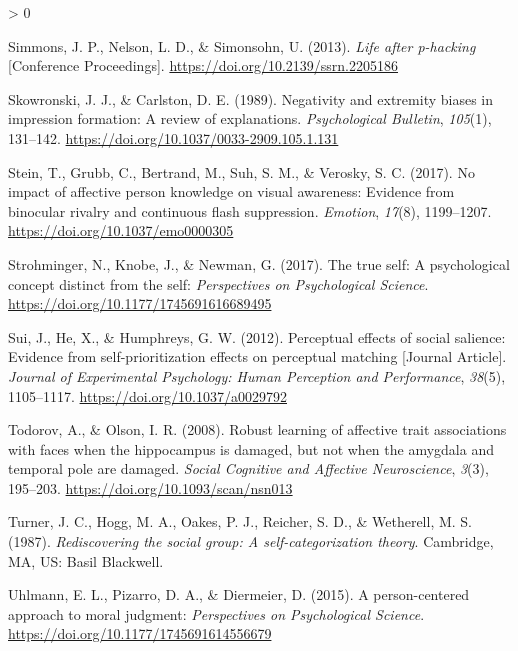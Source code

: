 \documentclass[
  english,
  man]{apa6}
\newlength{\cslhangindent}
\newenvironment{CSLReferences}[2] %
 {%
  \setlength{\parindent}{0pt}
  \ifodd #1 \everypar{\setlength{\hangindent}{\cslhangindent}}\ignorespaces\fi
  \ifnum #2 > 0
  \setlength{\parskip}{#2\baselineskip}
  \fi
 }%
 {}
\begin{document}
\begin{CSLReferences}{1}{0}
\leavevmode\hypertarget{ref-Simmons_2013_life}{}%
Simmons, J. P., Nelson, L. D., \& Simonsohn, U. (2013). \emph{Life after p-hacking} {[}Conference Proceedings{]}. \url{https://doi.org/10.2139/ssrn.2205186}

\leavevmode\hypertarget{ref-skowronski_negativity_1989}{}%
Skowronski, J. J., \& Carlston, D. E. (1989). Negativity and extremity biases in impression formation: A review of explanations. \emph{Psychological Bulletin}, \emph{105}(1), 131--142. \url{https://doi.org/10.1037/0033-2909.105.1.131}

\leavevmode\hypertarget{ref-stein_no_2017}{}%
Stein, T., Grubb, C., Bertrand, M., Suh, S. M., \& Verosky, S. C. (2017). No impact of affective person knowledge on visual awareness: Evidence from binocular rivalry and continuous flash suppression. \emph{Emotion}, \emph{17}(8), 1199--1207. \url{https://doi.org/10.1037/emo0000305}

\leavevmode\hypertarget{ref-strohminger_true_2017}{}%
Strohminger, N., Knobe, J., \& Newman, G. (2017). The true self: A psychological concept distinct from the self: \emph{Perspectives on Psychological Science}. \url{https://doi.org/10.1177/1745691616689495}

\leavevmode\hypertarget{ref-Sui_2012_JEPHPP}{}%
Sui, J., He, X., \& Humphreys, G. W. (2012). Perceptual effects of social salience: Evidence from self-prioritization effects on perceptual matching {[}Journal Article{]}. \emph{Journal of Experimental Psychology: Human Perception and Performance}, \emph{38}(5), 1105--1117. \url{https://doi.org/10.1037/a0029792}

\leavevmode\hypertarget{ref-todorov_robust_2008}{}%
Todorov, A., \& Olson, I. R. (2008). Robust learning of affective trait associations with faces when the hippocampus is damaged, but not when the amygdala and temporal pole are damaged. \emph{Social Cognitive and Affective Neuroscience}, \emph{3}(3), 195--203. \url{https://doi.org/10.1093/scan/nsn013}

\leavevmode\hypertarget{ref-turner_rediscovering_1987}{}%
Turner, J. C., Hogg, M. A., Oakes, P. J., Reicher, S. D., \& Wetherell, M. S. (1987). \emph{Rediscovering the social group: A self-categorization theory}. Cambridge, {MA}, {US}: Basil Blackwell.

\leavevmode\hypertarget{ref-uhlmann_person-centered_2015}{}%
Uhlmann, E. L., Pizarro, D. A., \& Diermeier, D. (2015). A person-centered approach to moral judgment: \emph{Perspectives on Psychological Science}. \url{https://doi.org/10.1177/1745691614556679}


\end{CSLReferences}
\end{document}
